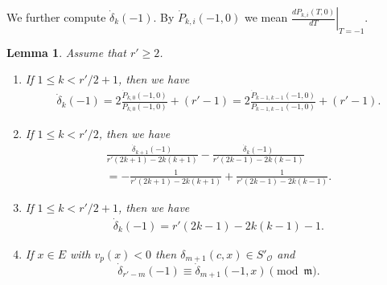 \documentclass[11pt]{amsart}
\theoremstyle{definition}
\numberwithin{equation}{subsection}
\theoremstyle{plain}
\theoremstyle{plain}
\theoremstyle{plain}
\theoremstyle{plain}
\theoremstyle{plain}
\theoremstyle{plain}
\theoremstyle{plain}
\theoremstyle{plain}
\theoremstyle{plain}
\newtheorem{lemm}[equation]{Lemma}
\theoremstyle{plain}
\theoremstyle{plain}
\theoremstyle{plain}
\theoremstyle{definition}
\theoremstyle{definition}
\theoremstyle{definition}
\theoremstyle{remark}
\renewcommand{\(}{\textup{(}}
\renewcommand{\)}{\textup{)}}
\newcommand{\fm}{\mathfrak{m}}
\newcommand{\cO}{\mathcal{O}}
\begin{document}
We further compute $\dot\delta_k(-1)$. By $\dot{P}_{k,i}(-1,0)$ we mean $\left.\frac{dP_{k,i}(T,0)}{dT}\right|_{T=-1}$.
\begin{lemm}\label{lemma-delta-derivative}
Assume that $r'\geq 2$.
\begin{enumerate}[leftmargin=*]
\item If $1\leq k< r'/2+1$, then we have
    \begin{align*}
        \dot{\delta}_k(-1)
        =
        2\frac{\dot{P}_{k,0}(-1,0)}{P_{k,0}(-1,0)}+(r'-1)
        =
        2\frac{\dot{P}_{k-1,k-1}(-1,0)}{P_{k-1,k-1}(-1,0)}+(r'-1).
    \end{align*}
\item If $1\leq k< r'/2$, then we have
    \begin{multline*}
        \frac{\dot{\delta}_{k+1}(-1)}{r'(2k+1)-2k(k+1)} - \frac{\dot{\delta}_k(-1)}{r'(2k-1)-2k(k-1)}\\
        = -\frac{1}{r'(2k+1)-2k(k+1)} +\frac{1}{r'(2k-1)-2k(k-1)}.
    \end{multline*}
\item If $1\leq k <r'/2+1$, then we have
    \begin{align*}
        \dot{\delta}_k(-1)=r'(2k-1)-2k(k-1)-1.
    \end{align*}
\item  If $x\in E$ with $v_p(x)<0$ then $\delta_{m+1}(c,x)\in S'_\cO$ and $$\dot{\delta}_{r'-m}(-1)\equiv\dot{\delta}_{m+1}(-1,x)\pmod{\fm}.$$

\end{enumerate}
\end{lemm}
\end{document}
